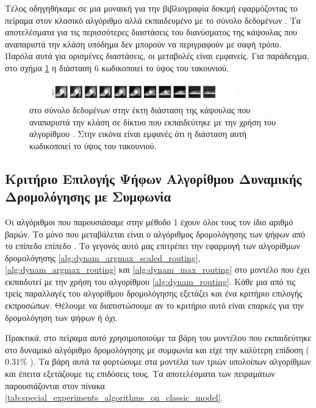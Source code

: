Τέλος οδηγηθήκαμε σε μια μοναική για την βιβλιογραφία δοκιμή εφαρμόζοντας το πείραμα στον κλασικό αλγόριθμο αλλά εκπαιδευμένο με το σύνολο δεδομένων . Τα αποτελέσματα για τις περισσότερες διαστάσεις του διανύσματος της κάψουλας που αναπαριστά την κλάση υπόδημα δεν μπορούν να περιγραφούν με σαφή τρόπο. Παρόλα αυτά για ορισμένες διαστάσεις, οι μεταβολές είναι εμφανείς. Για παράδειγμα, στο σχήμα \ref{fig:exp_method_1_special_perturb_4} η διάσταση 6 κωδικοποιεί το ύψος του τακουνιού.
\begin{figure}[h]
    \centering
    \includegraphics[width=0.8\textwidth]{images/chapter experiments/method 1/image 9/perturbations_11_sixth_dim.png}
    \caption{ στο σύνολο δεδομένων  στην έκτη διάσταση της κάψουλας  που αναπαριστά την κλάση  σε δίκτυο που εκπαιδεύτηκε με την χρήση του αλγορίθμου . Στην εικόνα είναι εμφανές ότι η διάσταση αυτή κωδικοποιεί το ύψος του τακουνιού.}
    \label{fig:exp_method_1_special_perturb_4}
  \end{figure}

\subsection{Κριτήριο Επιλογής Ψήφων Αλγορίθμου Δυναμικής Δρομολόγησης με Συμφωνία}

Οι αλγόριθμοι που παρουσιάσαμε στην μέθοδο 1 έχουν όλοι τους τον ίδιο αριθμό βαρών. Το μόνο που μεταβάλεται είναι ο αλγόριθμος δρομολόγησης των ψήφων από το επίπεδο  επίπεδο . Το γεγονός αυτό μας επιτρέπει την εφαρμογή των αλγορίθμων δρομολόγησης \ref{alg:dynam_argmax_scaled_routing}, \ref{alg:dynam_argmax_routing} και \ref{alg:dynam_max_routing} στο μοντέλο που έχει εκπαιδυτεί με την χρήση του αλγορίθμου \ref{alg:dynam_routing}. Κάθε μια από τις τρείς παραλλαγές του αλγορίθμου δρομολόγησης εξετάζει και ένα κριτήριο επιλογής εκπροσώπων. Θέλουμε να διαπιστώσουμε αν το κριτήριο αυτό είναι επαρκές για την δρομολόγηση των ψήφων ή όχι.\par

Πρακτικά, στο πείραμα αυτό χρησιμοποιούμε τα βάρη του μοντέλου που εκπαιδεύτηκε στο δυναμικό αλγόριθμο δρομολόγησης με συμφωνία και είχε την καλύτερη επίδοση ($0.31\%$ ). Τα βάρη αυτά τα φορτώουμε στα μοντέλα των τριών υπολοίπων αλγορίθμων και έπειτα εξετάζουμε τις επιδόσεις τους. Τα αποτελέσματα των πειραμάτων παρουσιάζονται στον πίνακα \ref{tab:special_experiments_algorithms_on_classic_model}. \par

